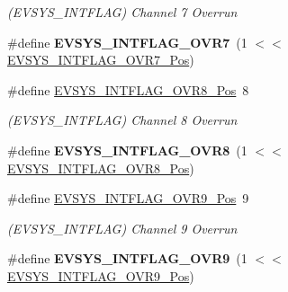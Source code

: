 \begin{DoxyCompactItemize}
\begin{DoxyCompactList}\small\item\em (E\+V\+S\+Y\+S\+\_\+\+I\+N\+T\+F\+L\+A\+G) Channel 7 Overrun \end{DoxyCompactList}\item 
\hypertarget{group___s_a_m_l21___e_v_s_y_s_ga07249e5cf762ecae5aa8825109cf4f5b}{}\#define {\bfseries E\+V\+S\+Y\+S\+\_\+\+I\+N\+T\+F\+L\+A\+G\+\_\+\+O\+V\+R7}~(1 $<$$<$ \hyperlink{group___s_a_m_l21___e_v_s_y_s_ga2cbfa2ba1dda7056d9ee7ec9692f1089}{E\+V\+S\+Y\+S\+\_\+\+I\+N\+T\+F\+L\+A\+G\+\_\+\+O\+V\+R7\+\_\+\+Pos})\label{group___s_a_m_l21___e_v_s_y_s_ga07249e5cf762ecae5aa8825109cf4f5b}

\item 
\hypertarget{group___s_a_m_l21___e_v_s_y_s_ga2d98f4e020e8af2fea9114a77262f025}{}\#define \hyperlink{group___s_a_m_l21___e_v_s_y_s_ga2d98f4e020e8af2fea9114a77262f025}{E\+V\+S\+Y\+S\+\_\+\+I\+N\+T\+F\+L\+A\+G\+\_\+\+O\+V\+R8\+\_\+\+Pos}~8\label{group___s_a_m_l21___e_v_s_y_s_ga2d98f4e020e8af2fea9114a77262f025}

\begin{DoxyCompactList}\small\item\em (E\+V\+S\+Y\+S\+\_\+\+I\+N\+T\+F\+L\+A\+G) Channel 8 Overrun \end{DoxyCompactList}\item 
\hypertarget{group___s_a_m_l21___e_v_s_y_s_ga6da17342d8276291bc43b9a9c1b89f3f}{}\#define {\bfseries E\+V\+S\+Y\+S\+\_\+\+I\+N\+T\+F\+L\+A\+G\+\_\+\+O\+V\+R8}~(1 $<$$<$ \hyperlink{group___s_a_m_l21___e_v_s_y_s_ga2d98f4e020e8af2fea9114a77262f025}{E\+V\+S\+Y\+S\+\_\+\+I\+N\+T\+F\+L\+A\+G\+\_\+\+O\+V\+R8\+\_\+\+Pos})\label{group___s_a_m_l21___e_v_s_y_s_ga6da17342d8276291bc43b9a9c1b89f3f}

\item 
\hypertarget{group___s_a_m_l21___e_v_s_y_s_gaab244fd5ea7e948edbda8cfd8e5700e2}{}\#define \hyperlink{group___s_a_m_l21___e_v_s_y_s_gaab244fd5ea7e948edbda8cfd8e5700e2}{E\+V\+S\+Y\+S\+\_\+\+I\+N\+T\+F\+L\+A\+G\+\_\+\+O\+V\+R9\+\_\+\+Pos}~9\label{group___s_a_m_l21___e_v_s_y_s_gaab244fd5ea7e948edbda8cfd8e5700e2}

\begin{DoxyCompactList}\small\item\em (E\+V\+S\+Y\+S\+\_\+\+I\+N\+T\+F\+L\+A\+G) Channel 9 Overrun \end{DoxyCompactList}\item 
\hypertarget{group___s_a_m_l21___e_v_s_y_s_ga7f8836bd3ceccae07da3f87fbf166fe0}{}\#define {\bfseries E\+V\+S\+Y\+S\+\_\+\+I\+N\+T\+F\+L\+A\+G\+\_\+\+O\+V\+R9}~(1 $<$$<$ \hyperlink{group___s_a_m_l21___e_v_s_y_s_gaab244fd5ea7e948edbda8cfd8e5700e2}{E\+V\+S\+Y\+S\+\_\+\+I\+N\+T\+F\+L\+A\+G\+\_\+\+O\+V\+R9\+\_\+\+Pos})\label{group___s_a_m_l21___e_v_s_y_s_ga7f8836bd3ceccae07da3f87fbf166fe0}


\end{DoxyCompactItemize}
